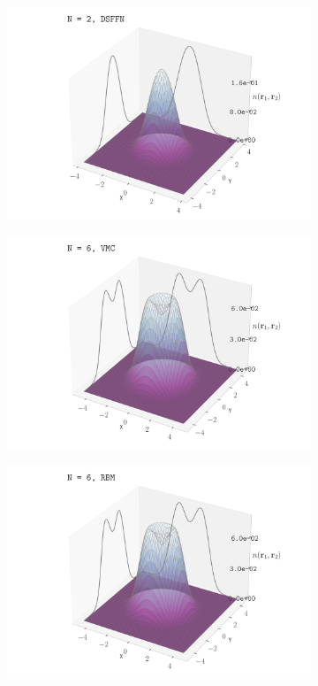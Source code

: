 \begin{figure}[H]
\begin{subfigure}[t]{0.32\textwidth}
        \includegraphics[width=\textwidth]{Chapters/Results/dots/density_profile_3d_N2_nqs_DSFFN_1.0.pdf}
        \label{fig:sub3}
    \end{subfigure}
    \begin{subfigure}[t]{0.32\textwidth}
        \centering
        \includegraphics[width=\textwidth]{Chapters/Results/dots/density_profile_3d_N6_nqs_VMC_1.0.pdf}
        \label{fig:sub1}
    \end{subfigure}
    \begin{subfigure}[t]{0.32\textwidth}
        \centering
        \includegraphics[width=\textwidth]{Chapters/Results/dots/density_profile_3d_N6_nqs_RBM_1.0.pdf}

\end{subfigure}
\end{figure}
